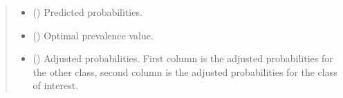 \documentclass[letterpaper,10pt,english]{sphinxmanual}
\begin{document}
\begin{fulllineitems}
\begin{fulllineitems}
\begin{quote}
\begin{description}
\begin{itemize}
\item {} 
\sphinxAtStartPar
{} () \textendash{} Predicted probabilities.

\end{itemize}

\begin{itemize}
\item {} 
\sphinxAtStartPar
{} () \textendash{} Optimal prevalence value.

\item {} 
\sphinxAtStartPar
{} () \textendash{} Adjusted probabilities. First column is the adjusted probabilities for the other class,
second column is the adjusted probabilities for the class of interest.

\end{itemize}

\end{description}\end{quote}

\end{fulllineitems}


\end{fulllineitems}

\end{document}
